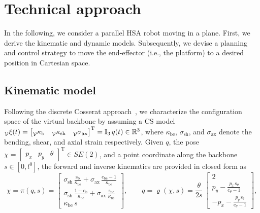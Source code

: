 \section{Technical approach}
In the following, we consider a parallel HSA robot moving in a plane. 
First, we derive the kinematic and dynamic models. Subsequently, we devise a planning and control strategy to move the end-effector (i.e., the platform) to a desired position in Cartesian space.

\subsection{Kinematic model}
Following the discrete Cosserat approach~\cite{renda2018discrete}, we characterize the configuration space of the virtual backbone by assuming a \gls{CS} model
$\prescript{}{\mathcal{V}}{\xi}(t) = \begin{bmatrix}\prescript{}{{\mathcal{V}}}{\kappa}_\mathrm{b} & \prescript{}{{\mathcal{V}}}{\kappa}_\mathrm{sh} & \prescript{}{{\mathcal{V}}}{\sigma}_\mathrm{ax}\end{bmatrix}^\mathrm{T} = \mathbb{I}_3 \, q(t) \in \mathbb{R}^3$, where $\kappa_\mathrm{be}$, $\sigma_\mathrm{sh}$, and $\sigma_\mathrm{ax}$ denote the bending, shear, and axial strain respectively.
Given $q$, the pose $\chi = \begin{bmatrix}
    p_x & p_y & \theta
\end{bmatrix}^\mathrm{T} \in SE(2)$, and a point coordinate along the backbone $s \in [0, l^0]$, the forward and inverse kinematics are provided in closed form as
\begin{equation}\label{eq:hsacontrol:kinematics}
    \chi = \pi(q, s) = \begin{bmatrix}
        \sigma_\mathrm{sh} \, \frac{\mathrm{s}_\mathrm{b}}{\kappa_\mathrm{be}} + \sigma_\mathrm{ax} \, \frac{\mathrm{c}_\mathrm{be}-1}{\kappa_\mathrm{be}}\\
        \sigma_\mathrm{sh} \, \frac{1-\mathrm{c}_\mathrm{b}}{\kappa_\mathrm{be}} + \sigma_\mathrm{ax} \, \frac{\mathrm{s}_\mathrm{be}}{\kappa_\mathrm{be}}\\
        \kappa_\mathrm{be} \, s
    \end{bmatrix},
    \qquad
    q = \varrho(\chi, s) 
    = \frac{\theta}{2s} \: \begin{bmatrix}
        2\\
        p_y - \frac{p_x \, \mathrm{s}_\theta}{\mathrm{c}_\theta-1}\\
        -p_x - \frac{p_y \, \mathrm{s}_\theta}{\mathrm{c}_\theta-1}
   \end{bmatrix},
\end{equation}
